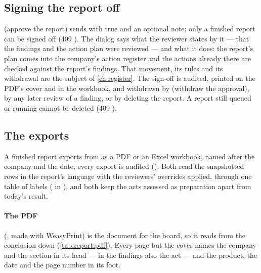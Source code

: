 \subsection{Signing the report off}

 (approve the report) sends  with
 true and an optional note; only a finished report can be signed off (409
). The dialog says what the reviewer states by it --- that the findings and
the action plan were reviewed --- and what it does: the report's plan comes into the company's
action register and the actions already there are checked against the report's findings. That
movement, its rules and its withdrawal are the subject of \cref{ch:register}. The sign-off is
audited, printed on the PDF's cover and in the workbook, and withdrawn by  (withdraw the approval), by any later review of a finding, or by deleting the
report. A report still queued or running cannot be deleted (409 ).

\subsection{The exports}

A finished report exports from  as a PDF or an Excel
workbook, named after the company and the date; every export is audited
(). Both read the snapshotted rows in the report's language with the
reviewers' overrides applied, through one table of labels ( in
), and both keep the acts assessed as preparation apart from today's
result.

\paragraph{The PDF} (, made with WeasyPrint) is the document for the
board, so it reads from the conclusion down (\cref{tab:report:pdf}). Every page but the cover
names the company and the section in its head --- in the findings also the act --- and the
product, the date and the page number in its foot.

